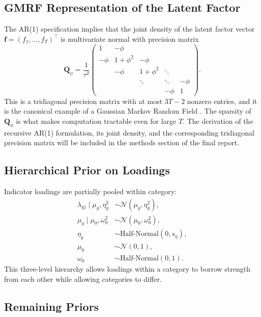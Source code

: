 \documentclass[11pt]{article}
\begin{document}
\subsection{GMRF Representation of the Latent Factor}

The AR(1) specification implies that the joint density of the latent factor vector $\mathbf{f} = (f_1, \dots, f_T)^\top$ is multivariate normal with precision matrix
\begin{equation}
\mathbf{Q}_\phi = \frac{1}{\tau^2}\begin{pmatrix}
1 & -\phi & & & \\
-\phi & 1+\phi^2 & -\phi & & \\
& -\phi & 1+\phi^2 & \ddots & \\
& & \ddots & \ddots & -\phi \\
& & & -\phi & 1
\end{pmatrix}.
\end{equation}
This is a tridiagonal precision matrix with at most $3T - 2$ nonzero entries, and it is the canonical example of a Gaussian Markov Random Field \citep{rue2005gaussian}. The sparsity of $\mathbf{Q}_\phi$ is what makes computation tractable even for large $T$. The derivation of the recursive AR(1) formulation, its joint density, and the corresponding tridiagonal precision matrix will be included in the methods section of the final report.

\subsection{Hierarchical Prior on Loadings}

Indicator loadings are partially pooled within category:
\begin{align}
\lambda_{gj} \mid \mu_g, \eta_g^2 &\sim \mathcal{N}(\mu_g, \eta_g^2), \\
\mu_g \mid \mu_0, \omega_0^2 &\sim \mathcal{N}(\mu_0, \omega_0^2), \\
\eta_g &\sim \text{Half-Normal}(0, s_\eta), \\
\mu_0 &\sim \mathcal{N}(0, 1), \\
\omega_0 &\sim \text{Half-Normal}(0, 1).
\end{align}
This three-level hierarchy allows loadings within a category to borrow strength from each other while allowing categories to differ.

\subsection{Remaining Priors}
\end{document}
